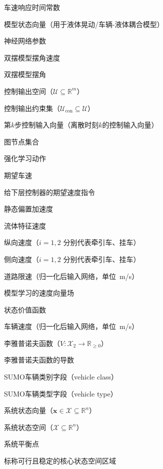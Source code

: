 \begin{denotation}[3cm]
  \item[{$\tau_v$}] 车速响应时间常数
  \item[{$\Theta$}] 模型状态向量（用于液体晃动/车辆-液体耦合模型）
  \item[{$\bm{\theta}$}] 神经网络参数
  \item[{$\dot{\theta}_1,\dot{\theta}_2$}] 双摆模型摆角速度
  \item[{$\theta_1,\theta_2$}] 双摆模型摆角
  \item[{$\mathcal{U}$}] 控制输出空间（$\mathcal{U} \subseteq \mathbb{R}^m$）
  \item[{$\mathcal{U}_{\text{con}}$}] 控制输出约束集（$\mathcal{U}_{\text{con}} \subseteq \mathcal{U}$）
  \item[{$u_k$}] 第$k$步控制输入向量（离散时刻$k$的控制输入向量）
  \item[{$\mathcal{V}$}] 图节点集合
  \item[{$v_{a}$}] 强化学习动作
  \item[{$v_{des}$}] 期望车速
  \item[{$v_{des}^a$}] 给下层控制器的期望速度指令
  \item[{$v_{dev}$}] 静态偏置加速度
  \item[{$v_f$}] 流体特征速度
  \item[{$v_{ix}$}] 纵向速度（$i=1,2$ 分别代表牵引车、挂车）
  \item[{$v_{iy}$}] 侧向速度（$i=1,2$ 分别代表牵引车、挂车）
  \item[{$v_{lim}$}] 道路限速（归一化后输入网络，单位\SI{}{m/s}）
  \item[{$v_t^{\bm{\theta}}$}] 模型学习的速度向量场
  \item[{$V_{\bm{\theta}}(s)$}] 状态价值函数
  \item[{$v_{veh}$}] 车辆速度（归一化后输入网络，单位\SI{}{m/s}）
  \item[{$V(\bm{x})$}] 李雅普诺夫函数（$V: \mathcal{X}_2 \to \mathbb{R}_{\geq 0}$）
  \item[{$\dot{V}(\bm{x})$}] 李雅普诺夫函数的导数
  \item[\texttt{vClass}] SUMO车辆类别字段（vehicle class）
  \item[\texttt{vtype}] SUMO车辆类型字段（vehicle type）
  \item[{$\bm{x}$}] 系统状态向量（$\bm{x} \in \mathcal{X} \subseteq \mathbb{R}^n$）
  \item[{$\mathcal{X}$}] 系统状态空间（$\mathcal{X} \subseteq \mathbb{R}^n$）
  \item[{$\bm{x}^*$}] 系统平衡点
  \item[{$\mathcal{X}_1$}] 标称可行且稳定的核心状态空间区域

\end{denotation}
